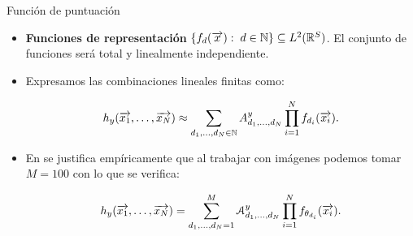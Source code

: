 \begin{frame}{Función de puntuación}

	\begin{itemize}
		\item \textbf{Funciones de representación} $\{ f_d(\overrightarrow{x}): \; d \in \mathbb{N} \} \subseteq L^2(\mathbb{R}^S)$. El conjunto de funciones será total y linealmente independiente.
		\item Expresamos las combinaciones lineales finitas como:

		      \begin{equation} \label{eq:hipotesis_en_general}
			      h_y(\overrightarrow{x_1}, \ldots, \overrightarrow{x_N}) \approx \sum_{d_1, \ldots, d_N \in \mathbb{N}} A^y_{d_1, \ldots, d_N} \prod_{i = 1}^N f_{d_i}(\overrightarrow{x_i}).
		      \end{equation}
		\item En \cite{matematicas:principal} se justifica empíricamente que al trabajar con imágenes podemos tomar $M=100$ con lo que se verifica:

		      \begin{equation} \label{eq:puntuacion_general}
			      h_y(\overrightarrow{x_1}, \ldots, \overrightarrow{x_N}) = \sum_{d_1, \ldots, d_N = 1}^{M} \mathcal{A}^y_{d_1, \ldots, d_N} \prod_{i = 1}^N f_{\theta_{d_i}}(\overrightarrow{x_i}).
		      \end{equation}
	\end{itemize}

\end{frame}

